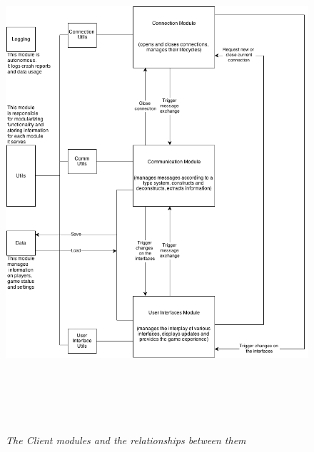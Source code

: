 \begin{figure}
\includegraphics[height=7.25in,width=6.23in]{./images/diagrams/gunrun_module_relationships_3.png}
\caption{\small \sl The Client modules and the
relationships between them 
\label{fig:clientModules}}
\end{figure}

